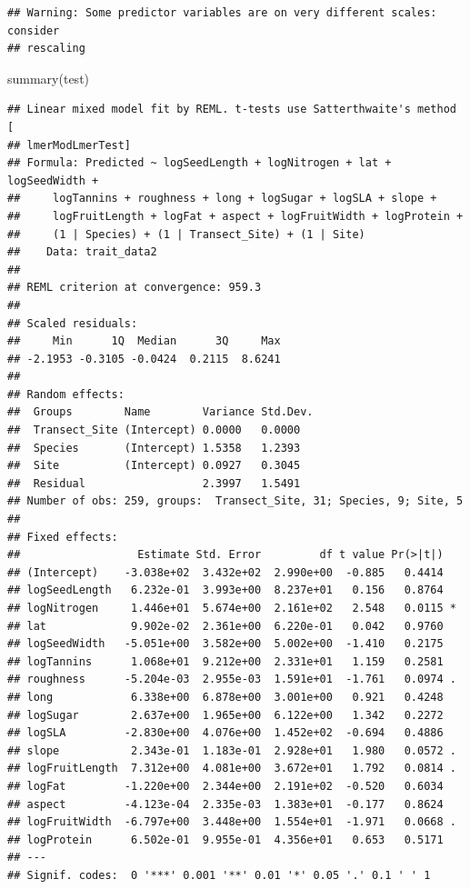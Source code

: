 \documentclass[
  12pt,
]{article}
\newenvironment{Shaded}{\begin{snugshade}}{\end{snugshade}}
\newcommand{\FunctionTok}[1]{\textcolor[rgb]{0.00,0.00,0.00}{#1}}
\newcommand{\NormalTok}[1]{#1}
\begin{document}
\begin{verbatim}
## Warning: Some predictor variables are on very different scales: consider
## rescaling
\end{verbatim}

\begin{Shaded}
\begin{Highlighting}[]
\FunctionTok{summary}\NormalTok{(test)}
\end{Highlighting}
\end{Shaded}

\begin{verbatim}
## Linear mixed model fit by REML. t-tests use Satterthwaite's method [
## lmerModLmerTest]
## Formula: Predicted ~ logSeedLength + logNitrogen + lat + logSeedWidth +  
##     logTannins + roughness + long + logSugar + logSLA + slope +  
##     logFruitLength + logFat + aspect + logFruitWidth + logProtein +  
##     (1 | Species) + (1 | Transect_Site) + (1 | Site)
##    Data: trait_data2
## 
## REML criterion at convergence: 959.3
## 
## Scaled residuals: 
##     Min      1Q  Median      3Q     Max 
## -2.1953 -0.3105 -0.0424  0.2115  8.6241 
## 
## Random effects:
##  Groups        Name        Variance Std.Dev.
##  Transect_Site (Intercept) 0.0000   0.0000  
##  Species       (Intercept) 1.5358   1.2393  
##  Site          (Intercept) 0.0927   0.3045  
##  Residual                  2.3997   1.5491  
## Number of obs: 259, groups:  Transect_Site, 31; Species, 9; Site, 5
## 
## Fixed effects:
##                  Estimate Std. Error         df t value Pr(>|t|)  
## (Intercept)    -3.038e+02  3.432e+02  2.990e+00  -0.885   0.4414  
## logSeedLength   6.232e-01  3.993e+00  8.237e+01   0.156   0.8764  
## logNitrogen     1.446e+01  5.674e+00  2.161e+02   2.548   0.0115 *
## lat             9.902e-02  2.361e+00  6.220e-01   0.042   0.9760  
## logSeedWidth   -5.051e+00  3.582e+00  5.002e+00  -1.410   0.2175  
## logTannins      1.068e+01  9.212e+00  2.331e+01   1.159   0.2581  
## roughness      -5.204e-03  2.955e-03  1.591e+01  -1.761   0.0974 .
## long            6.338e+00  6.878e+00  3.001e+00   0.921   0.4248  
## logSugar        2.637e+00  1.965e+00  6.122e+00   1.342   0.2272  
## logSLA         -2.830e+00  4.076e+00  1.452e+02  -0.694   0.4886  
## slope           2.343e-01  1.183e-01  2.928e+01   1.980   0.0572 .
## logFruitLength  7.312e+00  4.081e+00  3.672e+01   1.792   0.0814 .
## logFat         -1.220e+00  2.344e+00  2.191e+02  -0.520   0.6034  
## aspect         -4.123e-04  2.335e-03  1.383e+01  -0.177   0.8624  
## logFruitWidth  -6.797e+00  3.448e+00  1.554e+01  -1.971   0.0668 .
## logProtein      6.502e-01  9.955e-01  4.356e+01   0.653   0.5171  
## ---
## Signif. codes:  0 '***' 0.001 '**' 0.01 '*' 0.05 '.' 0.1 ' ' 1
\end{verbatim}
\end{document}
